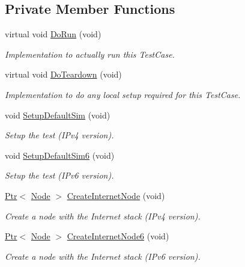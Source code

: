 \subsection*{Private Member Functions}
\begin{DoxyCompactItemize}
\item 
virtual void \hyperlink{classTcpTestCase_a8c4c4fa54e3c71ae1fca781357605134}{Do\+Run} (void)
\begin{DoxyCompactList}\small\item\em Implementation to actually run this Test\+Case. \end{DoxyCompactList}\item 
virtual void \hyperlink{classTcpTestCase_abca54d95eb30b20f74e19e77235b6794}{Do\+Teardown} (void)
\begin{DoxyCompactList}\small\item\em Implementation to do any local setup required for this Test\+Case. \end{DoxyCompactList}\item 
void \hyperlink{classTcpTestCase_aa0635586d1df558a59adf3ab92cdd511}{Setup\+Default\+Sim} (void)
\begin{DoxyCompactList}\small\item\em Setup the test (I\+Pv4 version). \end{DoxyCompactList}\item 
void \hyperlink{classTcpTestCase_ad45a412dd010f36d8b396ab83df8acd6}{Setup\+Default\+Sim6} (void)
\begin{DoxyCompactList}\small\item\em Setup the test (I\+Pv6 version). \end{DoxyCompactList}\item 
\hyperlink{classns3_1_1Ptr}{Ptr}$<$ \hyperlink{classns3_1_1Node}{Node} $>$ \hyperlink{classTcpTestCase_aa2bee178327783b9acb07d7351e1dcdf}{Create\+Internet\+Node} (void)
\begin{DoxyCompactList}\small\item\em Create a node with the Internet stack (I\+Pv4 version). \end{DoxyCompactList}\item 
\hyperlink{classns3_1_1Ptr}{Ptr}$<$ \hyperlink{classns3_1_1Node}{Node} $>$ \hyperlink{classTcpTestCase_a45d4f2a1d4a2f311c529469bdc9dfe00}{Create\+Internet\+Node6} (void)
\begin{DoxyCompactList}\small\item\em Create a node with the Internet stack (I\+Pv6 version). \end{DoxyCompactList}\item 

\end{DoxyCompactItemize}
